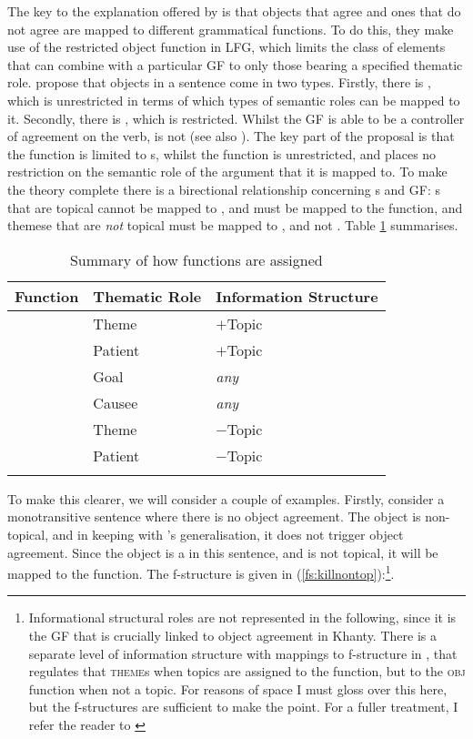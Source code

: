 \documentclass[output=paper
,modfonts
,nonflat]{langsci/langscibook}
\begin{document}
The key to the explanation offered by \citet{dn2011} is that objects that agree and ones that do not agree are mapped to different grammatical functions.
To do this, they make use of the restricted object function in LFG, which limits the class of elements that can combine with a particular GF to only those bearing a specified thematic role. 
\citeauthor{dn2011} propose that objects in a sentence come in two types.
Firstly, there is \object, which is unrestricted in terms of which types of semantic roles can be mapped to it. Secondly, there is \robj, which is restricted. 
Whilst the GF \object {} is able to be a controller of agreement on the verb, \robj {} is not (see also \citealt{buttking1996}). 
The key part of the proposal is that the \robj {} function is limited to \theme s, whilst the \object {} function is unrestricted, and places no restriction on the semantic role of the argument that it is mapped to. 
To make the theory complete there is a birectional relationship concerning \theme s and GF: \theme s that are topical cannot be mapped to \robj, and must be mapped to the \object {} function, and themese that are \emph{not} topical must be mapped to \robj, and not \object.
Table \ref{tab:dntabsummary} summarises.

\begin{table}
	\caption{\label{tab:dntabsummary}Summary of how functions are assigned}
	\begin{tabularx}{\textwidth}{XXX}
		\lsptoprule
		Function			&	Thematic Role	&	Information Structure\\
		\midrule
		\multirow{4}{*}{\object}	&	Theme		&	$+$Topic\\
		&	Patient		&	$+$Topic\\
		&	Goal			&	\emph{any}\\
		&	Causee		&	\emph{any}\\
		\midrule
		\multirow{2}{*}{\robj}	&	Theme		&	$-$Topic\\
		&	Patient		&	$-$Topic\\
		\lspbottomrule
	\end{tabularx}
\end{table}

\newpage\noindent To make this clearer, we will consider a couple of examples. Firstly, consider a monotransitive sentence where there is no object agreement. 
The object is non-topical, and in keeping with \citeauthor{dn2011}'s generalisation, it does not trigger object agreement. 
Since the object is a \theme {} in this sentence, and is not topical, it will be mapped to the \robj {} function. The f-structure is given in (\ref{fs:killnontop}):\footnote{Informational structural roles are not represented in the following, since it is the GF that is crucially linked to object agreement in Khanty.
There is a separate level of information structure with mappings to f-structure in \citet{dn2011}, that regulates that \textsc{theme}s when topics are assigned to the \robj {} function, but to the \textsc{obj} function when not a topic.
For reasons of space I must gloss over this here, but the f-structures are sufficient to make the point.
For a fuller treatment,  I refer the reader to \citet[][especially ch. 4]{dn2011}}.
\end{document}
